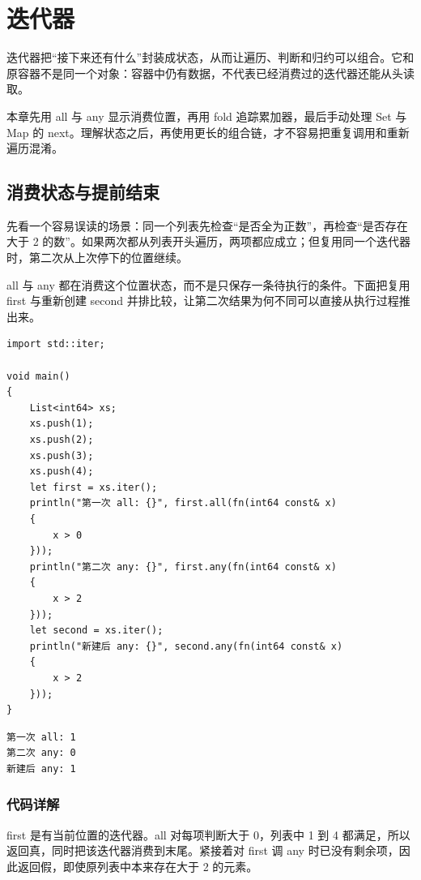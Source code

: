 \chapter{迭代器}
\label{ch:17}

迭代器把“接下来还有什么”封装成状态，从而让遍历、判断和归约可以组合。它和原容器不是同一个对象：容器中仍有数据，不代表已经消费过的迭代器还能从头读取。

本章先用 all 与 any 显示消费位置，再用 fold 追踪累加器，最后手动处理 Set 与 Map 的 next。理解状态之后，再使用更长的组合链，才不容易把重复调用和重新遍历混淆。

\section{消费状态与提前结束}

先看一个容易误读的场景：同一个列表先检查“是否全为正数”，再检查“是否存在大于 2 的数”。如果两次都从列表开头遍历，两项都应成立；但复用同一个迭代器时，第二次从上次停下的位置继续。

all 与 any 都在消费这个位置状态，而不是只保存一条待执行的条件。下面把复用 first 与重新创建 second 并排比较，让第二次结果为何不同可以直接从执行过程推出来。

\par
\medskip
\begin{lstlisting}[style=chali]
import std::iter;

void main()
{
    List<int64> xs;
    xs.push(1);
    xs.push(2);
    xs.push(3);
    xs.push(4);
    let first = xs.iter();
    println("第一次 all: {}", first.all(fn(int64 const& x)
    {
        x > 0
    }));
    println("第二次 any: {}", first.any(fn(int64 const& x)
    {
        x > 2
    }));
    let second = xs.iter();
    println("新建后 any: {}", second.any(fn(int64 const& x)
    {
        x > 2
    }));
}
\end{lstlisting}
\par
\medskip

\par
\medskip
\begin{lstlisting}[style=out]
第一次 all: 1
第二次 any: 0
新建后 any: 1
\end{lstlisting}
\par
\medskip

\subsection*{代码详解}

first 是有当前位置的迭代器。all 对每项判断大于 0，列表中 1 到 4 都满足，所以返回真，同时把该迭代器消费到末尾。紧接着对 first 调 any 时已没有剩余项，因此返回假，即使原列表中本来存在大于 2 的元素。


